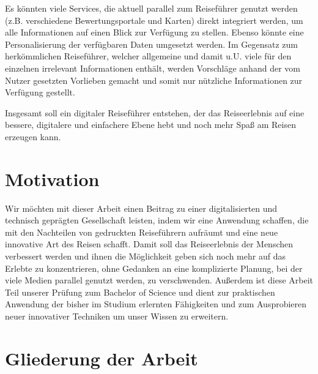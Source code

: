 	\vspace{0.25cm}

	Es könnten viele Services, die aktuell parallel zum Reiseführer genutzt werden (z.B. verschiedene Bewertungsportale und Karten) direkt integriert werden, um alle Informationen auf einen Blick zur Verfügung zu stellen. Ebenso könnte eine Personalisierung der verfügbaren Daten umgesetzt werden. Im Gegensatz zum herkömmlichen Reiseführer, welcher allgemeine und damit u.U. viele für den einzelnen irrelevant Informationen enthält, werden Vorschläge anhand der vom Nutzer gesetzten Vorlieben gemacht und somit nur nützliche Informationen zur Verfügung gestellt.

	\vspace{0.25cm}

	Insgesamt soll ein digitaler Reiseführer entstehen, der das Reiseerlebnis auf eine bessere, digitalere und einfachere Ebene hebt und noch mehr Spaß am Reisen erzeugen kann.

	\section{Motivation}

	Wir möchten mit dieser Arbeit einen Beitrag zu einer digitalisierten und technisch geprägten Gesellschaft leisten, indem wir eine Anwendung schaffen, die mit den Nachteilen von gedruckten Reiseführern aufräumt und eine neue innovative Art des Reisen schafft. Damit soll das Reiseerlebnis der Menschen verbessert werden und ihnen die Möglichkeit geben sich noch mehr auf das Erlebte zu konzentrieren, ohne Gedanken an eine komplizierte Planung, bei der viele Medien parallel genutzt werden, zu verschwenden.
	Außerdem ist diese Arbeit Teil unserer Prüfung zum Bachelor of Science und dient zur praktischen Anwendung der bisher im Studium erlernten Fähigkeiten und zum Ausprobieren neuer innovativer Techniken um unser Wissen zu erweitern.   

	\section{Gliederung der Arbeit}